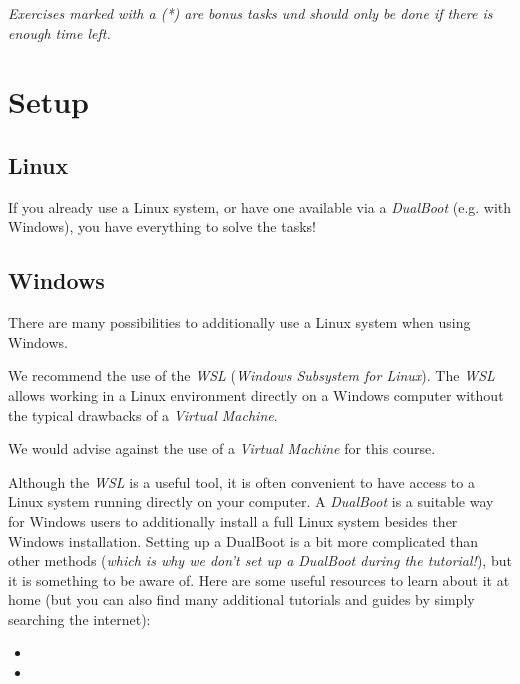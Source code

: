 \documentclass[english]{sheet}
\subtitle{Linux Exercise}
\begin{document}
\maketitle

\textit{Exercises marked with a (*) are bonus tasks und should only be done if there is enough time left.}

\section{Setup}

\subsection{Linux}

If you already use a Linux system, or have one available via a \emph{DualBoot} (e.g. with Windows), you have everything to solve the tasks!

\subsection{Windows}

There are many possibilities to additionally use a Linux system when using Windows.

We recommend the use of the \emph{WSL} (\emph{Windows Subsystem for Linux}). The \emph{WSL} allows working in a Linux environment directly on a Windows computer without the typical drawbacks of a \emph{Virtual Machine}.

We would advise against the use of a \emph{Virtual Machine} for this course.

Although the \emph{WSL} is a useful tool, it is often convenient to have access to a Linux system running directly on your computer. A \emph{DualBoot} is a suitable way for Windows users to additionally install a full Linux system besides ther Windows installation. Setting up a DualBoot is a bit more complicated than other methods (\emph{which is why we don't set up a DualBoot during the tutorial!}), but it is something to be aware of. Here are some useful resources to learn about it at home (but you can also find many additional tutorials and guides by simply searching the internet):

\begin{itemize}
    \item {}
    \item {}
\end{itemize}
\end{document}
